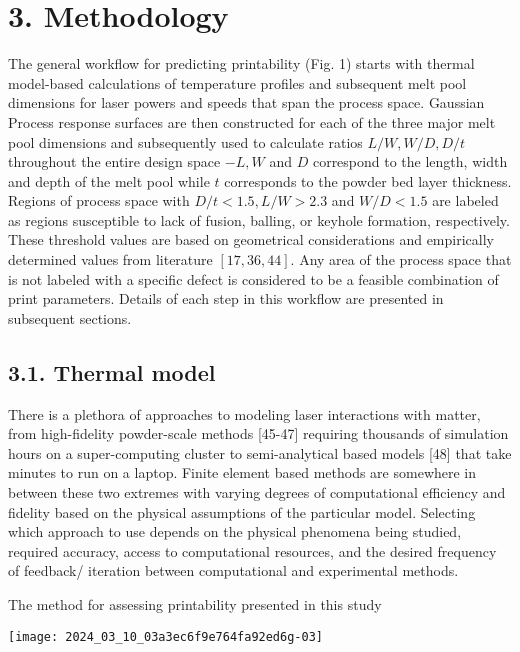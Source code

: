 \documentclass[10pt]{article}
\begin{document}
\section*{3. Methodology}
The general workflow for predicting printability (Fig. 1) starts with thermal model-based calculations of temperature profiles and subsequent melt pool dimensions for laser powers and speeds that span the process space. Gaussian Process response surfaces are then constructed for each of the three major melt pool dimensions and subsequently used to calculate ratios $L / W, W / D, D / t$ throughout the entire design space $-L, W$ and $D$ correspond to the length, width and depth of the melt pool while $t$ corresponds to the powder bed layer thickness. Regions of process space with $D / t<1.5, L / W>2.3$ and $W / D<1.5$ are labeled as regions susceptible to lack of fusion, balling, or keyhole formation, respectively. These threshold values are based on geometrical considerations and empirically determined values from literature $[17,36,44]$. Any area of the process space that is not labeled with a specific defect is considered to be a feasible combination of print parameters. Details of each step in this workflow are presented in subsequent sections.

\subsection*{3.1. Thermal model}
There is a plethora of approaches to modeling laser interactions with matter, from high-fidelity powder-scale methods [45-47] requiring thousands of simulation hours on a super-computing cluster to semi-analytical based models [48] that take minutes to run on a laptop. Finite element based methods are somewhere in between these two extremes with varying degrees of computational efficiency and fidelity based on the physical assumptions of the particular model. Selecting which approach to use depends on the physical phenomena being studied, required accuracy, access to computational resources, and the desired frequency of feedback/ iteration between computational and experimental methods.

The method for assessing printability presented in this study

\begin{center}
\texttt{[image: 2024\_03\_10\_03a3ec6f9e764fa92ed6g-03]}
\end{center}
\end{document}
